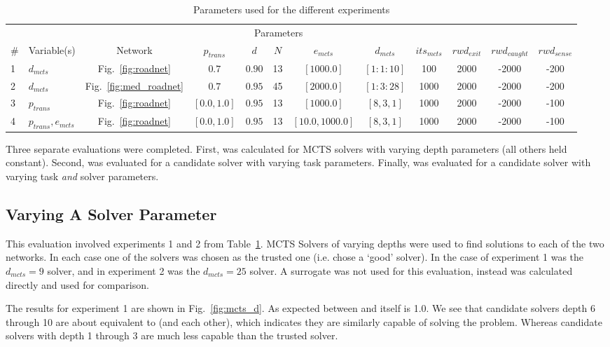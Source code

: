 \begin{table}
    \footnotesize
    \centering
    \caption{Parameters used for the different experiments}
    \label{tab:exps}
    \begin{tabular}{llcccccccccc} \toprule
        &\multicolumn{10}{c}{Parameters} \\ \cmidrule(r){3-12}
        \#  & Variable(s) & Network &$p_{trans}$&$d$&$N$&$e_{mcts}$&$d_{mcts}$&$its_{mcts}$&$rwd_{exit}$&$rwd_{caught}$&$rwd_{sense}$ \\ \midrule
        1 & ${d_{mcts}}$ & Fig.~\ref{fig:roadnet} & $0.7$ & $0.90$ & 13 & $[1000.0]$ & $[1:1:10]$ & 100 & 2000 & -2000 & -200\\
        2 & ${d_{mcts}}$ & Fig.~\ref{fig:med_roadnet} & $0.7$ & $0.95$ & 45 & $[2000.0]$ & $[1:3:28]$ & 1000 & 2000 & -2000 & -200\\
        3 & ${p_{trans}}$& Fig.~\ref{fig:roadnet} & $[0.0,1.0]$ & $0.95$ & 13 & $[1000.0]$ & $[8,3,1]$ & 1000 & 2000 & -2000 & -100\\
        4 & ${p_{trans},e_{mcts}}$ & Fig.~\ref{fig:roadnet} & $[0.0,1.0]$ & $0.95$ & 13 & $[10.0,1000.0]$ & $[8,3,1]$ & 1000 & 2000 & -2000 & -100\\
    \end{tabular}
    \vspace{-0.3cm}
\end{table}

Three separate evaluations were completed. First, \xQ{} was calculated for MCTS solvers with varying depth parameters (all others held constant). Second, \xQ{} was evaluated for a candidate solver with varying task parameters. Finally, \xQ{} was evaluated for a candidate solver with varying task \emph{and} solver parameters.

\subsection{Varying A Solver Parameter}
This evaluation involved experiments 1 and 2 from Table~\ref{tab:exps}. MCTS Solvers of varying depths were used to find solutions to each of the two networks. In each case one of the solvers was chosen as the trusted one (i.e. chose a `good' solver). In the case of experiment 1 \solvestar{} was the $d_{mcts}=9$ solver, and in experiment 2 \solvestar{} was the $d_{mcts}=25$ solver. A surrogate \surrogate{} was not used for this evaluation, instead \rwdstar{} was calculated directly and used for comparison.

The results for experiment 1 are shown in Fig.~\ref{fig:mcts_d}. As expected \xQ{} between \solvestar{} and itself is 1.0. We see that candidate solvers depth 6 through 10 are about equivalent to \solvestar{} (and each other), which indicates they are similarly capable of solving the problem. Whereas candidate solvers with depth 1 through 3 are much less capable than the trusted solver.


